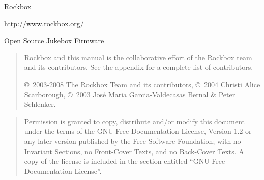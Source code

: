 %
%
%
%
%
\ifpdfoutput{
\newcommand{\latexbuild}{pdf\LaTeX}}
{\newcommand{\latexbuild}{\TeX4ht}}

%
{\begin{center}{\Large{Rockbox}}\end{center}}

\vspace{1cm}
\noindent
\begin{center}
\url{http://www.rockbox.org/}

\noindent
Open Source Jukebox Firmware
\end{center}

\vspace{6cm}
\begin{quote}
Rockbox and this manual is the collaborative effort of the
Rockbox team and its contributors. See the appendix for a complete list of
contributors.

\copyright~2003-2008 The Rockbox Team and its contributors,
\copyright~2004 Christi Alice Scarborough,
\copyright~2003 Jos\'{e} Maria Garcia-Valdecasas Bernal \& Peter Schlenker.
\end{quote}
\vspace{3mm}
\begin{center}
\end{center}

\vspace{\fill}
\begin{quote}
  Permission is granted to copy, distribute and/or modify this document
  under the terms of the GNU Free Documentation License, Version 1.2
  or any later version published by the Free Software Foundation;
  with no Invariant Sections, no Front-Cover Texts, and no Back-Cover Texts.
  A copy of the license is included in the section entitled ``GNU
  Free Documentation License''.
\end{quote}


